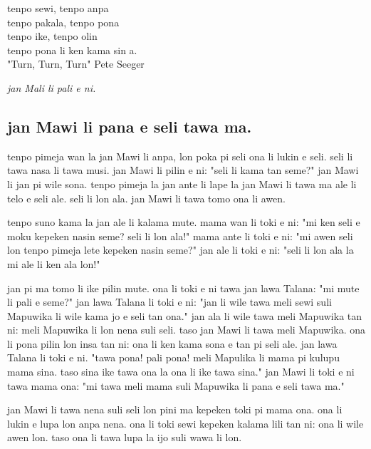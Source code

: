 tenpo sewi, tenpo anpa \\
tenpo pakala, tenpo pona \\
tenpo ike, tenpo olin \\
tenpo pona li ken kama sin a. \\

"Turn, Turn, Turn" Pete Seeger

\textit{jan Mali li pali e ni. \cite{www:astrodonunt:01}}

\newpage

\subsection{jan Mawi li pana e seli tawa ma.}
tenpo pimeja wan la jan Mawi li anpa, lon poka pi seli ona li lukin e seli.
seli li tawa nasa li tawa musi.
jan Mawi li pilin e ni: "seli li kama tan seme?"
jan Mawi li jan pi wile sona.
tenpo pimeja la jan ante li lape la jan Mawi li tawa ma ale li telo e seli ale.
seli li lon ala.
jan Mawi li tawa tomo ona li awen.

tenpo suno kama la jan ale li kalama mute.
mama wan li toki e ni: "mi ken seli e moku kepeken nasin seme?
seli li lon ala!"
mama ante li toki e ni: "mi awen seli lon tenpo pimeja lete kepeken nasin seme?"
jan ale li toki e ni: "seli li lon ala la mi ale li ken ala lon!"

jan pi ma tomo li ike pilin mute.
ona li toki e ni tawa jan lawa Talana: "mi mute li pali e seme?"
jan lawa Talana li toki e ni: "jan li wile tawa meli sewi suli Mapuwika li wile kama jo e seli tan ona."
jan ala li wile tawa meli Mapuwika tan ni: meli Mapuwika li lon nena suli seli.
taso jan Mawi li tawa meli Mapuwika.
ona li pona pilin lon insa tan ni: ona li ken kama sona e tan pi seli ale.
jan lawa Talana li toki e ni.
"tawa pona!
pali pona!
meli Mapulika li mama pi kulupu mama sina.
taso sina ike tawa ona la ona li ike tawa sina."
jan Mawi li toki e ni tawa mama ona: "mi tawa meli mama suli Mapuwika li pana e seli tawa ma."

jan Mawi li tawa nena suli seli lon pini ma kepeken toki pi mama ona.
ona li lukin e lupa lon anpa nena.
ona li toki sewi kepeken kalama lili tan ni: ona li wile awen lon.
taso ona li tawa lupa la ijo suli wawa li lon.


